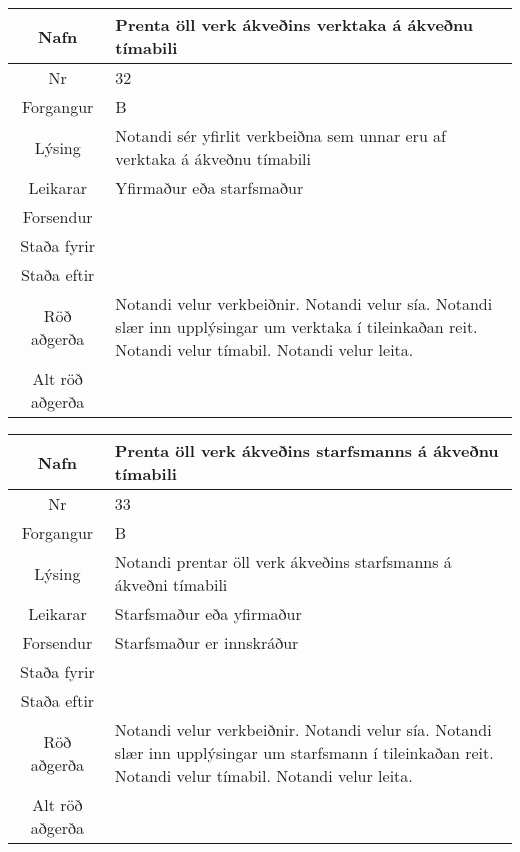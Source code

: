 \begin{table}[h!]\centering
\begin{tabular}{|c|p{10cm}|}
\hline
Nafn&Prenta öll verk ákveðins verktaka á ákveðnu tímabili\\
\hline
Nr&32\\
\hline
Forgangur&B\\
\hline
Lýsing&Notandi sér yfirlit verkbeiðna sem unnar eru af verktaka á ákveðnu tímabili\\
\hline
Leikarar&Yfirmaður eða starfsmaður\\
\hline
Forsendur&\\
\hline
Staða fyrir&\\
\hline
Staða eftir&\\
\hline
Röð aðgerða&Notandi velur verkbeiðnir. Notandi velur sía. Notandi slær inn upplýsingar um verktaka í tileinkaðan reit. Notandi velur tímabil. Notandi velur leita.\\
\hline
Alt röð aðgerða&\\
\hline
\end{tabular}
\end{table}
\caption{Use case 32}\label{tab:use_case_32}
\begin{table}[h!]\centering
\begin{tabular}{|c|p{10cm}|}
\hline
Nafn&Prenta öll verk ákveðins starfsmanns á ákveðnu tímabili\\
\hline
Nr&33\\
\hline
Forgangur&B\\
\hline
Lýsing&Notandi prentar öll verk ákveðins starfsmanns á ákveðni tímabili\\
\hline
Leikarar&Starfsmaður eða yfirmaður\\
\hline
Forsendur&Starfsmaður er innskráður\\
\hline
Staða fyrir&\\
\hline
Staða eftir&\\
\hline
Röð aðgerða&Notandi velur verkbeiðnir. Notandi velur sía. Notandi slær inn upplýsingar um starfsmann í tileinkaðan reit. Notandi velur tímabil. Notandi velur leita.\\
\hline
Alt röð aðgerða&\\
\hline
\end{tabular}
\end{table}
\caption{Use case 33}\label{tab:use_case_33}
